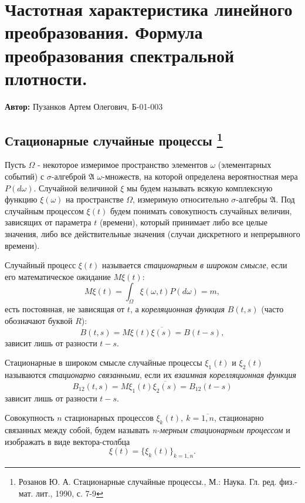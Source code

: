 
\section{Частотная характеристика линейного преобразования. Формула преобразования спектральной плотности.}

 \textbf{Автор:} Пузанков Артем Олегович, Б-01-003

\subsection{Стационарные случайные процессы \footnote{Розанов Ю. А. Стационарные случайные процессы., М.: Наука. Гл. ред. физ.-мат. лит., 1990, с. 7-9} }

Пусть $\Omega$ - некоторое измеримое пространство элементов $\omega$ (элементарных событий) с $\sigma$-алгеброй $\mathfrak{A}$ $\omega$-множеств, на которой определена вероятностная мера $P(d\omega)$. Случайной величиной $\xi$ мы будем называть всякую комплексную функцию $\xi(\omega)$ на пространстве $\Omega$, измеримую относительно $\sigma$-алгебры $\mathfrak{A}$. Под случайным процессом $\xi(t)$ будем понимать совокупность случайных величин, зависящих от параметра $t$ (времени), который принимает либо все целые значения, либо все действительные значения (случаи дискретного и непрерывного времени).

\begin{definition} Случайный процесс $\xi(t)$ называется \emph{стационарным в широком смысле}, если его математическое ожидание $M\xi(t)$: $$M\xi(t) = \int_{\Omega}\xi(\omega,t)P(d\omega) = m,$$ есть постоянная, не зависящая от $t$, а \emph{кореляционная функция} $B(t,s)$ (часто обозначают буквой $R$): $$B(t,s) = M\xi(t)\overline{\xi(s)} = B(t-s),$$ зависит лишь от разности $t-s$.
\end{definition}

 \begin{definition} Стационарные в широком смысле случайные процессы $\xi_1(t)$ и $\xi_2(t)$ называются \emph{стационарно связанными}, если их \emph{взаимная корелляционная функция} $$B_{12}(t,s) = M\xi_1(t)\overline{\xi_2(s)} = B_{12}(t-s)$$ зависит лишь от разности $t-s$.
 \end{definition}

\begin{definition}  Совокупность $n$ стационарных процессов $\xi_k(t), \ k = \overline{1,n}$, стационарно связанных между собой, будем называть \emph{n-мерным стационарным процессом} и изображать в виде вектора-столбца $$\xi(t) = \{\xi_k(t)\}_{k=\overline{1,n}}.$$
\end{definition}

